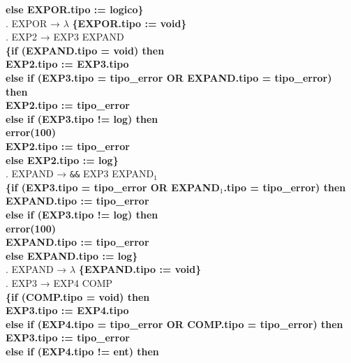 \begin{tabbing}
    \>              \> \textbf{else EXPOR.tipo := logico\}}\\
    . EXPOR → $\lambda$ \textbf{\{EXPOR.tipo := void\}}\\
    . EXP2 → EXP3 EXPAND\\
    \>              \> \textbf{\{if (EXPAND.tipo = void) then}\\
    \>              \>          \> \textbf{EXP2.tipo := EXP3.tipo}\\
    \>              \> \textbf{else if (EXP3.tipo = tipo\_error OR EXPAND.tipo = tipo\_error) then}\\
    \>              \>          \> \textbf{EXP2.tipo := tipo\_error}\\
    \>              \> \textbf{else if (EXP3.tipo != log) then}\\
    \>              \>          \> \textbf{error(100)}\\
    \>              \>          \> \textbf{EXP2.tipo := tipo\_error}\\
    \>              \> \textbf{else EXP2.tipo := log\}}\\
    . EXPAND → \verb!&&! EXP3 EXPAND$_1$\\
    \>              \>\textbf{\{if (EXP3.tipo = tipo\_error OR EXPAND$_1$.tipo = tipo\_error) then}\\
    \>              \>          \> \textbf{EXPAND.tipo := tipo\_error}\\
    \>              \>\textbf{ else if (EXP3.tipo != log) then}\\
    \>              \>          \> \textbf{error(100)}\\
    \>              \>          \> \textbf{EXPAND.tipo := tipo\_error}\\
    \>              \> \textbf{else EXPAND.tipo := log\}}\\
    . EXPAND → $\lambda$ \textbf{\{EXPAND.tipo := void\}}\\
    . EXP3 → EXP4 COMP\\
    \>              \> \textbf{\{if (COMP.tipo = void) then}\\
    \>              \>          \> \textbf{EXP3.tipo := EXP4.tipo}\\
    \>              \> \textbf{else if (EXP4.tipo = tipo\_error OR COMP.tipo = tipo\_error) then}\\
    \>              \>          \> \textbf{EXP3.tipo := tipo\_error}\\
    \>              \> \textbf{else if (EXP4.tipo != ent) then}\\

\end{tabbing}

